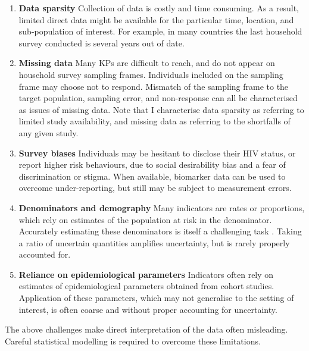 \documentclass[a4paper, nobind]{templates/ociamthesis}
\providecommand{\tightlist}{%
  \setlength{\itemsep}{0pt}\setlength{\parskip}{0pt}}
\begin{document}
\begin{enumerate}
\def\labelenumi{\arabic{enumi}.}
\tightlist
\item
  \textbf{Data sparsity}
  Collection of data is costly and time consuming.
  As a result, limited direct data might be available for the particular time, location, and sub-population of interest.
  For example, in many countries the last household survey conducted is several years out of date.
\item
  \textbf{Missing data}
  Many KPs are difficult to reach, and do not appear on household survey sampling frames.
  Individuals included on the sampling frame may choose not to respond.
  Mismatch of the sampling frame to the target population, sampling error, and non-response can all be characterised as issues of missing data.
  Note that I characterise data sparsity as referring to limited study availability, and missing data as referring to the shortfalls of any given study.
\item
  \textbf{Survey biases}
  Individuals may be hesitant to disclose their HIV status, or report higher risk behaviours, due to social desirability bias and a fear of discrimination or stigma.
  When available, biomarker data can be used to overcome under-reporting, but still may be subject to measurement errors.
\item
  \textbf{Denominators and demography}
  Many indicators are rates or proportions, which rely on estimates of the population at risk in the denominator.
  Accurately estimating these denominators is itself a challenging task \autocite{tatem2017worldpop}.
  Taking a ratio of uncertain quantities amplifies uncertainty, but is rarely properly accounted for.
\item
  \textbf{Reliance on epidemiological parameters}
  Indicators often rely on estimates of epidemiological parameters obtained from cohort studies.
  Application of these parameters, which may not generalise to the setting of interest, is often coarse and without proper accounting for uncertainty.
\end{enumerate}

The above challenges make direct interpretation of the data often misleading.
Careful statistical modelling is required to overcome these limitations.
\end{document}
